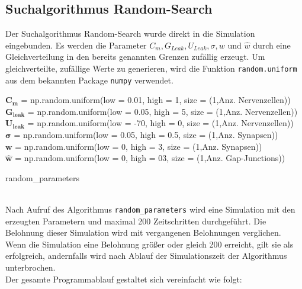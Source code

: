 	\subsection{Suchalgorithmus Random-Search}
		Der Suchalgorithmus Random-Search wurde direkt in die Simulation eingebunden. Es werden die Parameter $C_m, G_{Leak}, U_{Leak}, \sigma, w$ und $\hat{w}$ durch eine Gleichverteilung in den bereits genannten Grenzen zufällig erzeugt. Um gleichverteilte, zufällige Werte zu generieren, wird die Funktion \texttt{random.uniform} aus dem bekannten Package \texttt{numpy} \cite{NumPy} verwendet.\\
		\begin{algorithm}
			
				$\boldsymbol{C_m}$ = np.random.uniform(low = 0.01, high = 1, size = (1,Anz. Nervenzellen))\\
				$\boldsymbol{G_{leak}}$ = np.random.uniform(low = 0.05, high = 5, size = (1,Anz. Nervenzellen))\\
				$\boldsymbol{U_{leak}}$ = np.random.uniform(low = -70, high = 0, size = (1,Anz. Nervenzellen))\\
				$\boldsymbol{\sigma}$ = np.random.uniform(low = 0.05, high = 0.5, size = (1,Anz. Synapsen))\\
				$\boldsymbol{w}$ = np.random.uniform(low = 0, high = 3, size = (1,Anz. Synapsen))\\
				$\boldsymbol{\hat{w}}$ = np.random.uniform(low = 0, high = 03, size = (1,Anz. Gap-Junctions))\\
			\caption{random\_parameters}
		\end{algorithm}\\
		Nach Aufruf des Algorithmus \texttt{random\_parameters} wird eine Simulation mit den erzeugten Parametern und maximal 200 Zeitschritten durchgeführt. Die Belohnung dieser Simulation wird mit vergangenen Belohnungen verglichen. Wenn die Simulation eine Belohnung größer oder gleich 200 erreicht, gilt sie als erfolgreich, andernfalls wird nach Ablauf der Simulationszeit der Algorithmus unterbrochen.\\
		Der gesamte Programmablauf gestaltet sich vereinfacht wie folgt:
